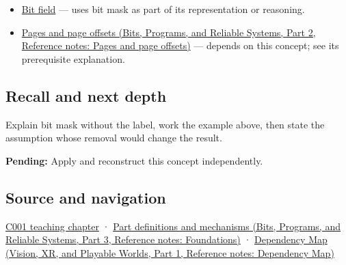 \hypertarget{appendix-dbe5905163c2-used-by}{}

\begin{itemize}
\item
  \hyperref[appendix-ac697f5c66e8]{Bit field} --- uses bit mask as part of its representation or reasoning.
\item
  \href{../01-Bits-Programs-and-Reliable-Systems-P02/main.pdf\#nameddest=appendix-0c67cd5bf30a}{Pages and page offsets (Bits, Programs, and Reliable Systems, Part 2, Reference notes: Pages and page offsets)} --- depends on this concept; see its prerequisite explanation.
\end{itemize}

\subsection{Recall and next depth}\label{appendix-dbe5905163c2-recall-and-next-depth}

\hypertarget{appendix-dbe5905163c2-recall-and-next-depth}{}

Explain bit mask without the label, work the example above, then state the assumption whose removal would change the result.

\textbf{Pending:} Apply and reconstruct this concept independently.

\subsection{Source and navigation}\label{appendix-dbe5905163c2-source-and-navigation}

\hypertarget{appendix-dbe5905163c2-source-and-navigation}{}

\hyperref[01-foundations-i-ch001-from-a-signal-to-an-interpretation]{C001 teaching chapter} · \href{../01-Bits-Programs-and-Reliable-Systems-P03/main.pdf\#nameddest=appendix-fd090d982a15}{Part definitions and mechanisms (Bits, Programs, and Reliable Systems, Part 3, Reference notes: Foundations)} · \href{../07-Vision-XR-and-Playable-Worlds-P01/main.pdf\#nameddest=appendix-4ad47bdd269a}{Dependency Map (Vision, XR, and Playable Worlds, Part 1, Reference notes: Dependency Map)}
